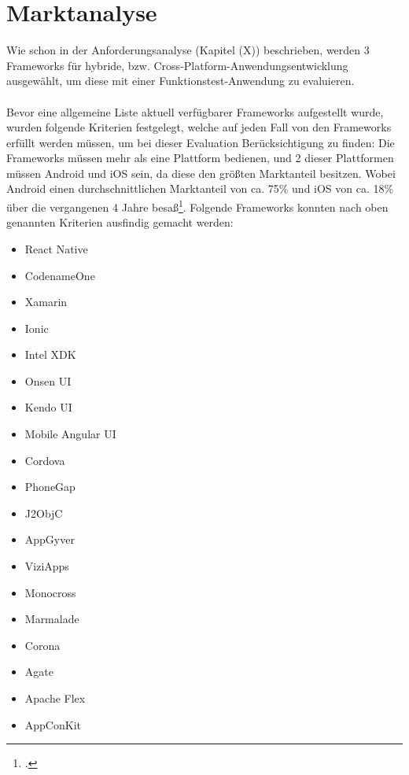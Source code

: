 \chapter{Marktanalyse}

Wie schon in der Anforderungsanalyse (Kapitel (X)) beschrieben, werden 3 Frameworks für hybride, bzw. Cross-Platform-Anwendungsentwicklung ausgewählt, um diese mit einer Funktionstest-Anwendung zu evaluieren.
\\
\\
Bevor eine allgemeine Liste aktuell verfügbarer Frameworks aufgestellt wurde, wurden folgende Kriterien festgelegt, welche auf jeden Fall von den Frameworks erfüllt werden müssen, um bei dieser Evaluation Berücksichtigung zu finden: Die Frameworks müssen mehr als eine Plattform bedienen, und 2 dieser Plattformen müssen Android und iOS sein, da diese den größten Marktanteil besitzen. Wobei Android einen durchschnittlichen Marktanteil von ca. 75\% und iOS von ca. 18\% über die vergangenen 4 Jahre besaß\footcite{Statista}.
Folgende Frameworks konnten nach oben genannten Kriterien ausfindig gemacht werden:
\\
\begin{itemize}
\item React Native
\item CodenameOne
\item Xamarin
\item Ionic
\item Intel XDK
\item Onsen UI
\item Kendo UI
\item Mobile Angular UI
\item Cordova
\item PhoneGap
\item J2ObjC
\item AppGyver
\item ViziApps
\item Monocross
\item Marmalade
\item Corona
\item Agate
\item Apache Flex
\item AppConKit
\end{itemize}

